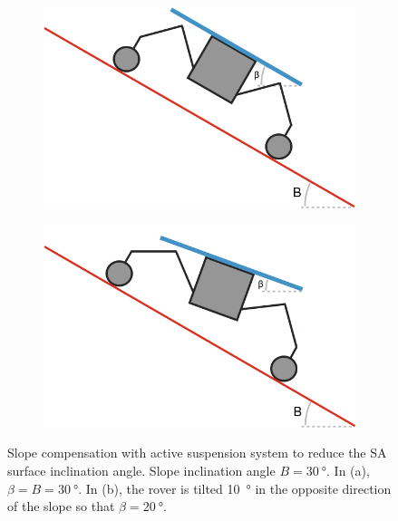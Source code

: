 \documentclass[twocolumn,letterpaper]{IEEEAerospaceCLS}  %
\newlength{\subfigureWidth}
\newlength{\graphicsHeight}
\begin{document}
\begin{figure}[h]
\captionsetup[subfigure]{justification=centering}
  \centering
  \begin{subfigure}[t]{\subfigureWidth}
    \centering
    \includegraphics[height=\graphicsHeight]{figures/images/stick-rover-beta-large.png}
    \label{fig:sub:rover-on-slope-beta-large}
  \end{subfigure}\hfill
  \begin{subfigure}[t]{\subfigureWidth}
    \centering
    \includegraphics[height=\graphicsHeight]{figures/images/stick-rover-beta-small.png}
    \label{fig:sub:rover-on-slope-beta-small}
  \end{subfigure}
  \caption{Slope compensation with active suspension system to reduce the \ac{SA} surface inclination angle. Slope inclination angle $B = \SI{30}{\degree}$. In (a), $\beta = B = \SI{30}{\degree}$. In (b), the rover is tilted \SI{10}{\degree} in the opposite direction of the slope so that $\beta = \SI{20}{\degree}$.}
  \label{fig:sub:rover-on-slope-beta}
\end{figure}
\end{document}
